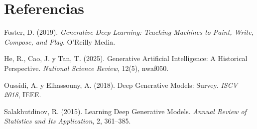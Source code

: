 \documentclass[11pt,letterpaper]{article}
\theoremstyle{definition}
\newenvironment{referencias}
  {\begin{list}{}{\setlength{\leftmargin}{1.5em}\setlength{\itemindent}{-1.5em}\setlength{\itemsep}{0.3em}\setlength{\parsep}{0pt}}}
  {\end{list}}
\begin{document}
\section*{Referencias}

\begin{referencias}
  \item Foster, D. (2019). \emph{Generative Deep Learning: Teaching Machines to Paint, Write, Compose, and Play}. O'Reilly Media.
  \item He, R., Cao, J. y Tan, T. (2025). Generative Artificial Intelligence: A Historical Perspective. \emph{National Science Review}, 12(5), nwaf050.
  \item Oussidi, A. y Elhassouny, A. (2018). Deep Generative Models: Survey. \emph{ISCV 2018}, IEEE.
  \item Salakhutdinov, R. (2015). Learning Deep Generative Models. \emph{Annual Review of Statistics and Its Application}, 2, 361--385.
\end{referencias}
\end{document}
